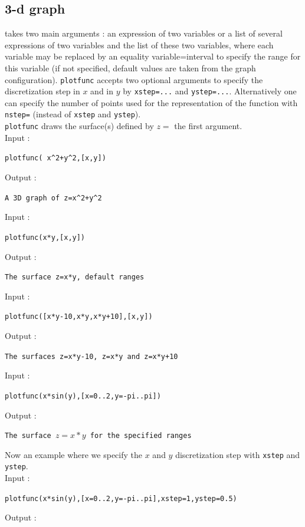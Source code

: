 \documentclass[a4paper,11pt]{book}
\begin{document}
\subsection{3-d graph}\label{sec:plotfunc3}
 takes two main arguments : an expression of two 
variables or a list of several expressions of two variables and the list of 
these two variables, where each variable may be replaced by
an equality variable=interval to specify the range for this variable
(if not specified, default values are taken from the graph configuration).
{\tt plotfunc} accepts two optional arguments to specify 
the discretization step in $x$ and in $y$ by
{\tt xstep=...} and {\tt ystep=...}.
Alternatively one can specify the number of points used for the 
representation of the function with \verb|nstep=| (instead of \verb|xstep| and 
{\tt ystep}).\\
{\tt plotfunc} draws the surface(s) defined by $z=$ the first argument.\\
Input :
\begin{center}{\tt plotfunc( x\verb|^|2+y\verb|^|2,[x,y])}\end{center}
Output :
\begin{center}{\tt A 3D graph of z=x\verb|^|2+y\verb|^|2}\end{center}
Input :
\begin{center}{\tt plotfunc(x*y,[x,y]) }\end{center}
Output :
\begin{center}{\tt The surface z=x*y, default ranges}\end{center}
Input :
\begin{center}{\tt plotfunc([x*y-10,x*y,x*y+10],[x,y]) }\end{center}
Output :
\begin{center}{\tt The surfaces z=x*y-10, z=x*y and z=x*y+10}\end{center}
Input :
\begin{center}{\tt plotfunc(x*sin(y),[x=0..2,y=-pi..pi]) }\end{center}
Output :
\begin{center}{\tt The surface $z=x*y$ for the specified ranges}\end{center}
Now an example where we specify the $x$ and $y$ discretization step 
with \verb|xstep| and \verb|ystep|.\\
Input :
\begin{center}
{\tt plotfunc(x*sin(y),[x=0..2,y=-pi..pi],xstep=1,ystep=0.5) }\end{center}
Output :
\end{document}
